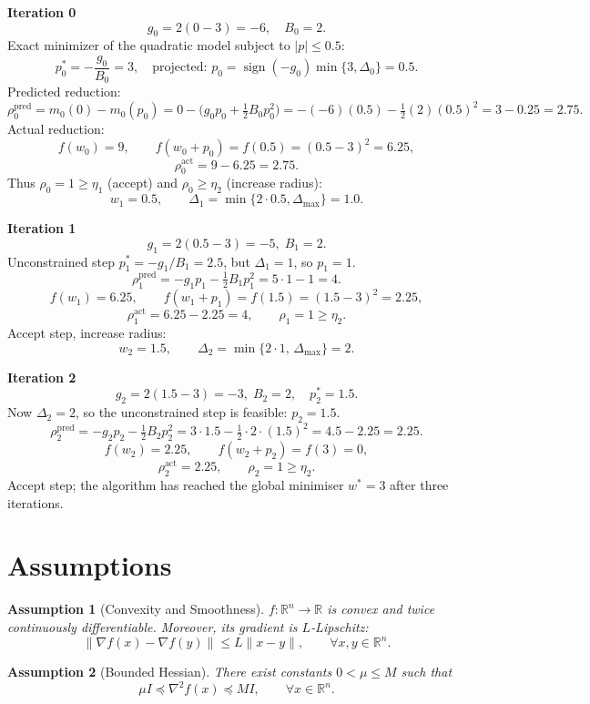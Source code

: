 \documentclass{article}
\newtheorem{assumption}{Assumption}
\begin{document}
\medskip
\noindent\textbf{Iteration 0}
\[
g_{0}=2(0-3)=-6,\quad B_{0}=2.
\]
Exact minimizer of the quadratic model subject to $|p|\le0.5$:
\[
p_{0}^{*}= -\frac{g_{0}}{B_{0}} = 3,\quad\text{projected: }p_{0}= \operatorname{sign}(-g_{0})\min\{3,\Delta_{0}\}=0.5 .
\]
Predicted reduction:
\[
\rho^{\mathrm{pred}}_{0}=m_{0}(0)-m_{0}(p_{0})
=0-\bigl(g_{0}p_{0}+\tfrac12 B_{0}p_{0}^{2}\bigr)
= -(-6)(0.5)-\tfrac12(2)(0.5)^{2}=3-0.25=2.75 .
\]
Actual reduction:
\[
f(w_{0})=9,\qquad f(w_{0}+p_{0})=f(0.5)=(0.5-3)^{2}=6.25,
\]
\[
\rho^{\mathrm{act}}_{0}=9-6.25=2.75.
\]
Thus $\rho_{0}=1\ge\eta_{1}$ (accept) and $\rho_{0}\ge\eta_{2}$ (increase radius):
\[
w_{1}=0.5,\qquad \Delta_{1}= \min\{2\cdot0.5,\Delta_{\max}\}=1.0 .
\]

\medskip
\noindent\textbf{Iteration 1}
\[
g_{1}=2(0.5-3)=-5,\; B_{1}=2.
\]
Unconstrained step $p^{*}_{1}= -g_{1}/B_{1}=2.5$, but $\Delta_{1}=1$, so $p_{1}=1$.
\[
\rho^{\mathrm{pred}}_{1}= -g_{1}p_{1}-\tfrac12 B_{1}p_{1}^{2}=5\cdot1-1=4.
\]
\[
f(w_{1})=6.25,\qquad f(w_{1}+p_{1})=f(1.5)=(1.5-3)^{2}=2.25,
\]
\[
\rho^{\mathrm{act}}_{1}=6.25-2.25=4,\qquad \rho_{1}=1\ge\eta_{2}.
\]
Accept step, increase radius:
\[
w_{2}=1.5,\qquad \Delta_{2}= \min\{2\cdot1,\,\Delta_{\max}\}=2 .
\]

\medskip
\noindent\textbf{Iteration 2}
\[
g_{2}=2(1.5-3)=-3,\; B_{2}=2,\quad p^{*}_{2}=1.5.
\]
Now $\Delta_{2}=2$, so the unconstrained step is feasible: $p_{2}=1.5$.
\[
\rho^{\mathrm{pred}}_{2}= -g_{2}p_{2}-\tfrac12 B_{2}p_{2}^{2}=3\cdot1.5- \tfrac12\cdot2\cdot(1.5)^{2}=4.5-2.25=2.25.
\]
\[
f(w_{2})=2.25,\qquad f(w_{2}+p_{2})=f(3)=0,
\]
\[
\rho^{\mathrm{act}}_{2}=2.25,\qquad \rho_{2}=1\ge\eta_{2}.
\]
Accept step; the algorithm has reached the global minimiser $w^{*}=3$ after three
iterations.

\section*{Assumptions}
\begin{assumption}[Convexity and Smoothness]\label{as:convex}
$f:\mathbb{R}^{n}\to\mathbb{R}$ is convex and twice continuously differentiable.
Moreover, its gradient is $L$‑Lipschitz:
\[
\|\nabla f(x)-\nabla f(y)\|\le L\|x-y\|,\qquad\forall x,y\in\mathbb{R}^{n}.
\tag{A1}
\]
\end{assumption}

\begin{assumption}[Bounded Hessian]\label{as:hessian}
There exist constants $0<\mu\le M$ such that
\[
\mu I \preceq \nabla^{2}f(x) \preceq M I,\qquad\forall x\in\mathbb{R}^{n}.
\tag{A2}
\]
\end{assumption}
\end{document}
